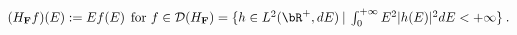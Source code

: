 \begin{equation}(H_{\bf F}f)(E) := Ef(E) \:\: \mbox{for $f\in {\cal D}(H_{\bf F}) = 
\{h\in L^2(\bR^+,dE) \:|\: \int_{0}^{+\infty} E^2 |h(E)|^2 dE <+\infty\}$}
\label{HF} \:. \end{equation}

